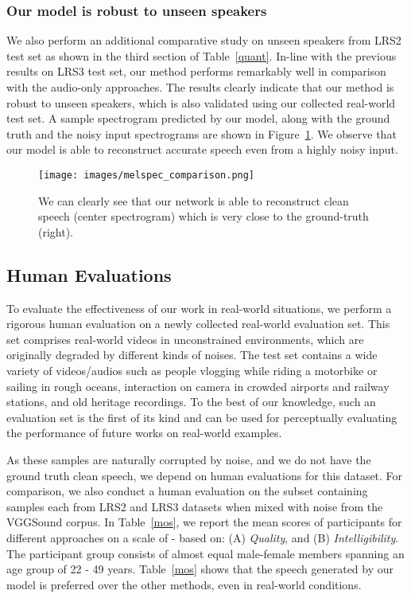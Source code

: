 \documentclass[10pt,twocolumn,letterpaper]{article}
\begin{document}
\subsubsection{Our model is robust to unseen speakers}
We also perform an additional comparative study on unseen speakers from LRS2 test set as shown in the third section of Table~\ref{quant}. In-line with the previous results on LRS3 test set, our method performs remarkably well in comparison with the audio-only approaches. The results clearly indicate that our method is robust to unseen speakers, which is also validated using our collected real-world test set. A sample spectrogram predicted by our model, along with the ground truth and the noisy input spectrograms are shown in Figure~\ref{fig:speech_res}. We observe that our model is able to reconstruct accurate speech even from a highly noisy input.


\begin{figure}[ht]
  \texttt{[image: images/melspec\_comparison.png]}
  \caption{We can clearly see that our network is able to reconstruct clean speech (center spectrogram) which is very close to the ground-truth (right).}
  \label{fig:speech_res}
  \vspace{-10pt}
\end{figure}
 

\subsection{Human Evaluations}
To evaluate the effectiveness of our work in real-world situations, we perform a rigorous human evaluation on a newly collected real-world evaluation set. This set comprises  real-world videos in unconstrained environments, which are originally degraded by different kinds of noises. The test set contains a wide variety of videos/audios such as people vlogging while riding a motorbike or sailing in rough oceans, interaction on camera in crowded airports and railway stations, and old heritage recordings. To the best of our knowledge, such an evaluation set is the first of its kind and can be used for perceptually evaluating the performance of future works on real-world examples. 

As these samples are naturally corrupted by noise, and we do not have the ground truth clean speech, we depend on human evaluations for this dataset. For comparison, we also conduct a human evaluation on the subset containing  samples each from LRS2 and LRS3 datasets when mixed with noise from the VGGSound corpus. In Table~\ref{mos}, we report the mean scores of  participants for different approaches on a scale of - based on: (A) \textit{Quality}, and (B) \textit{Intelligibility}. The participant group consists of almost equal male-female members spanning an age group of 22 - 49 years. Table~\ref{mos} shows that the speech generated by our model is preferred over the other methods, even in real-world conditions.
\end{document}
